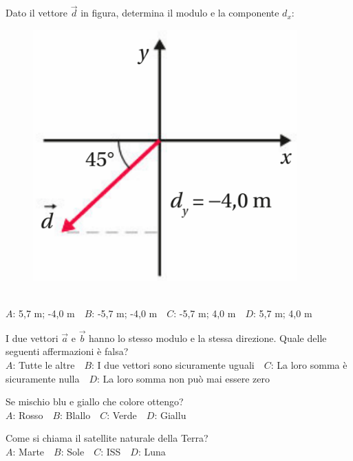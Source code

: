 \mcquestionheader Dato il vettore $\vec{d}$ in figura, determina il modulo e la componente $d_x$: \begin{figure}[h!]   \begin{center}     \includegraphics[scale=0.35]{vettored.png}   \end{center} \end{figure}\\
{$A$}: 5,7 m; -4,0 m\ \ {$B$}: -5,7 m; -4,0 m\ \ {$C$}: -5,7 m; 4,0 m\ \ {$D$}: 5,7 m; 4,0 m\ \ 

\mcquestionfooter



\def\mcquestionnumber{9}


\mcquestionheader I due vettori $\vec{a}$ e $\vec{b}$ hanno lo stesso modulo e la stessa direzione. Quale delle seguenti affermazioni è falsa?\\
{$A$}: Tutte le altre\ \ {$B$}: I due vettori sono sicuramente uguali\ \ {$C$}: La loro somma è sicuramente nulla\ \ {$D$}: La loro somma non può mai essere zero\ \ 

\mcquestionfooter



\def\mcquestionnumber{10}


\mcquestionheader Se mischio blu e giallo che colore ottengo?\\
{$A$}: Rosso\ \ {$B$}: Blallo\ \ {$C$}: Verde\ \ {$D$}: Giallu\ \ 

\mcquestionfooter



\def\mcquestionnumber{11}


\mcquestionheader Come si chiama il satellite naturale della Terra?\\
{$A$}: Marte\ \ {$B$}: Sole\ \ {$C$}: ISS\ \ {$D$}: Luna\ \ 

